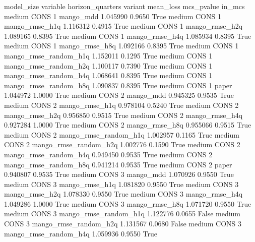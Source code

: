 model_size variable  horizon_quarters               variant  mean_loss  mcs_pvalue  in_mcs
    medium     CONS                 1             mango_mdd   1.045990      0.9650    True
    medium     CONS                 1        mango_rmse_h1q   1.116312      0.4915    True
    medium     CONS                 1        mango_rmse_h2q   1.089165      0.8395    True
    medium     CONS                 1        mango_rmse_h4q   1.085934      0.8395    True
    medium     CONS                 1        mango_rmse_h8q   1.092166      0.8395    True
    medium     CONS                 1 mango_rmse_random_h1q   1.152011      0.1295    True
    medium     CONS                 1 mango_rmse_random_h2q   1.100117      0.7390    True
    medium     CONS                 1 mango_rmse_random_h4q   1.068641      0.8395    True
    medium     CONS                 1 mango_rmse_random_h8q   1.090837      0.8395    True
    medium     CONS                 1                 paper   1.044972      1.0000    True
    medium     CONS                 2             mango_mdd   0.945325      0.9535    True
    medium     CONS                 2        mango_rmse_h1q   0.978104      0.5240    True
    medium     CONS                 2        mango_rmse_h2q   0.956850      0.9515    True
    medium     CONS                 2        mango_rmse_h4q   0.927284      1.0000    True
    medium     CONS                 2        mango_rmse_h8q   0.955066      0.9515    True
    medium     CONS                 2 mango_rmse_random_h1q   1.002957      0.1165    True
    medium     CONS                 2 mango_rmse_random_h2q   1.002776      0.1590    True
    medium     CONS                 2 mango_rmse_random_h4q   0.949450      0.9535    True
    medium     CONS                 2 mango_rmse_random_h8q   0.941214      0.9535    True
    medium     CONS                 2                 paper   0.940807      0.9535    True
    medium     CONS                 3             mango_mdd   1.070926      0.9550    True
    medium     CONS                 3        mango_rmse_h1q   1.081820      0.9550    True
    medium     CONS                 3        mango_rmse_h2q   1.078330      0.9550    True
    medium     CONS                 3        mango_rmse_h4q   1.049286      1.0000    True
    medium     CONS                 3        mango_rmse_h8q   1.071720      0.9550    True
    medium     CONS                 3 mango_rmse_random_h1q   1.122776      0.0655   False
    medium     CONS                 3 mango_rmse_random_h2q   1.131567      0.0680   False
    medium     CONS                 3 mango_rmse_random_h4q   1.059936      0.9550    True

